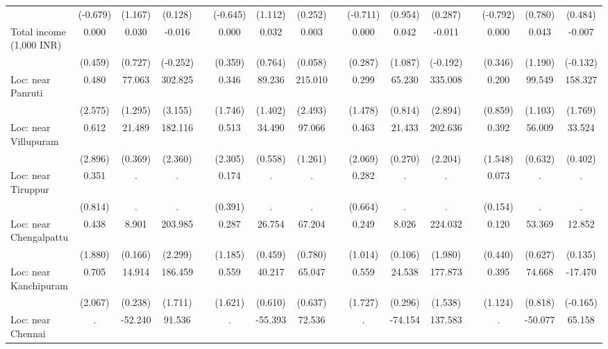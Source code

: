 {\begin{longtable}{@{\extracolsep{\fill}}lccccccccccccccc}
          & (-0.679) & (1.167) & (0.128) &       & (-0.645) & (1.112) & (0.252) &       & (-0.711) & (0.954) & (0.287) &       & (-0.792) & (0.780) & (0.484) \\
    Total income (1,000 INR) & 0.000 & 0.030 & -0.016 &       & 0.000 & 0.032 & 0.003 &       & 0.000 & 0.042 & -0.011 &       & 0.000 & 0.043 & -0.007 \\
          & (0.459) & (0.727) & (-0.252) &       & (0.359) & (0.764) & (0.058) &       & (0.287) & (1.087) & (-0.192) &       & (0.346) & (1.190) & (-0.132) \\
    Loc: near Panruti & 0.480 & 77.063 & 302.825 &       & 0.346 & 89.236 & 215.010 &       & 0.299 & 65.230 & 335.008 &       & 0.200 & 99.549 & 158.327 \\
          & (2.575) & (1.295) & (3.155) &       & (1.746) & (1.402) & (2.493) &       & (1.478) & (0.814) & (2.894) &       & (0.859) & (1.103) & (1.769) \\
    Loc: near Villupuram & 0.612 & 21.489 & 182.116 &       & 0.513 & 34.490 & 97.066 &       & 0.463 & 21.433 & 202.636 &       & 0.392 & 56.009 & 33.524 \\
          & (2.896) & (0.369) & (2.360) &       & (2.305) & (0.558) & (1.261) &       & (2.069) & (0.270) & (2.204) &       & (1.548) & (0.632) & (0.402) \\
    Loc: near Tiruppur & 0.351 & .     & .     &       & 0.174 & .     & .     &       & 0.282 & .     & .     &       & 0.073 & .     & . \\
          & (0.814) & .     & .     &       & (0.391) & .     & .     &       & (0.664) & .     & .     &       & (0.154) & .     & . \\
    Loc: near Chengalpattu & 0.438 & 8.901 & 203.985 &       & 0.287 & 26.754 & 67.204 &       & 0.249 & 8.026 & 224.032 &       & 0.120 & 53.369 & 12.852 \\
          & (1.880) & (0.166) & (2.299) &       & (1.185) & (0.459) & (0.780) &       & (1.014) & (0.106) & (1.980) &       & (0.440) & (0.627) & (0.135) \\
    Loc: near Kanchipuram & 0.705 & 14.914 & 186.459 &       & 0.559 & 40.217 & 65.047 &       & 0.559 & 24.538 & 177.873 &       & 0.395 & 74.668 & -17.470 \\
          & (2.067) & (0.238) & (1.711) &       & (1.621) & (0.610) & (0.637) &       & (1.727) & (0.296) & (1.538) &       & (1.124) & (0.818) & (-0.165) \\
    Loc: near Chennai & .     & -52.240 & 91.536 &       & .     & -55.393 & 72.536 &       & .     & -74.154 & 137.583 &       & .     & -50.077 & 65.158 \\

\end{longtable}}
